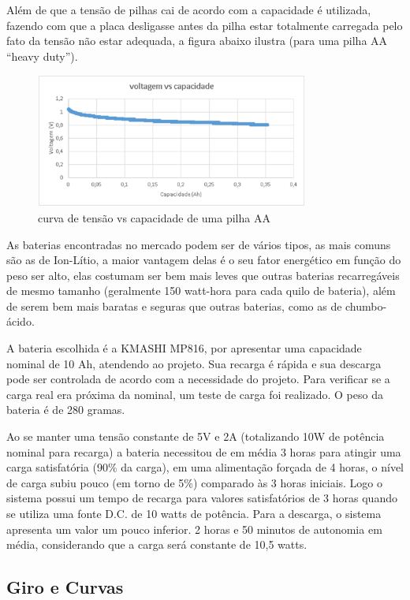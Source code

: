 Além de que a tensão de pilhas cai de acordo com a capacidade é utilizada, fazendo com que a placa desligasse antes da pilha estar totalmente carregada pelo fato da tensão não estar adequada, a figura abaixo ilustra (para uma pilha AA “heavy duty”).

\begin{figure}[H]
    \centering
    \includegraphics[width=0.8\textwidth]{figuras/volt_vs_cap.eps}
    \caption{curva de tensão vs capacidade de uma pilha AA}
    \label{fig:catia01}
\end{figure}

As baterias encontradas no mercado podem ser de vários tipos, as mais comuns são as de Ion-Lítio, a maior vantagem delas é o seu fator energético em função do peso ser alto, elas costumam ser bem mais leves que outras baterias recarregáveis de mesmo tamanho (geralmente 150 watt-hora para cada quilo de bateria), além de serem bem mais baratas e seguras que outras baterias, como as de chumbo-ácido.

A bateria escolhida é a KMASHI MP816, por apresentar uma capacidade nominal de 10 Ah, atendendo ao projeto. Sua recarga é rápida e sua descarga pode ser controlada de acordo com a necessidade do projeto.  Para verificar se a carga real era próxima da nominal, um teste de carga foi realizado. O peso da bateria é de 280 gramas.

Ao se manter uma tensão constante de 5V e 2A (totalizando 10W de potência nominal para recarga) a bateria necessitou de em média 3 horas para atingir uma carga satisfatória (90\% da carga), em uma alimentação forçada de 4 horas, o nível de carga subiu pouco (em torno de 5\%) comparado às 3 horas iniciais. Logo o sistema possui um tempo de recarga para valores satisfatórios de 3 horas quando se utiliza uma fonte D.C. de 10 watts de potência. Para a descarga, o sistema apresenta um valor um pouco inferior. 2 horas e 50 minutos de autonomia em média, considerando que a carga será constante de 10,5 watts.

\subsection{Giro e Curvas}

